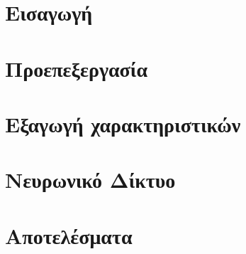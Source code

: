 \documentclass[12pt]{article}
\begin{document}
\maketitle \newpage
{}
\tableofcontents \newpage

\section{Εισαγωγή}


\section{Προεπεξεργασία}


\section{Εξαγωγή χαρακτηριστικών}\label{feature_extraction}


\section{Νευρωνικό Δίκτυο}


\section{Αποτελέσματα}


\newpage
\begin{english} %
	\renewcommand{\refname}{Αναφορές}
	
	
\end{english}
\end{document}
